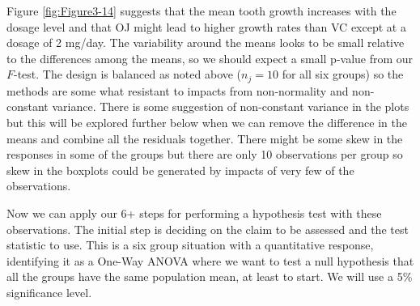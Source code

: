 \documentclass[]{book}
\theoremstyle{definition}
\theoremstyle{definition}
\theoremstyle{remark}
\begin{document}
Figure \ref{fig:Figure3-14} suggests that the mean tooth growth
increases with the dosage level and that OJ might lead to higher growth
rates than VC except at a dosage of 2 mg/day. The variability around the
means looks to be small relative to the differences among the means, so
we should expect a small p-value from our \(F\)-test. The design is
balanced as noted above (\(n_j=10\) for all six groups) so the methods
are some what resistant to impacts from non-normality and non-constant
variance. There is some suggestion of non-constant variance in the plots
but this will be explored further below when we can remove the
difference in the means and combine all the residuals together. There
might be some skew in the responses in some of the groups but there are
only 10 observations per group so skew in the boxplots could be
generated by impacts of very few of the observations.

Now we can apply our 6+ steps for performing a hypothesis test with
these observations. The initial step is deciding on the claim to be
assessed and the test statistic to use. This is a six group situation
with a quantitative response, identifying it as a One-Way ANOVA where we
want to test a null hypothesis that all the groups have the same
population mean, at least to start. We will use a 5\% significance
level.
\end{document}
